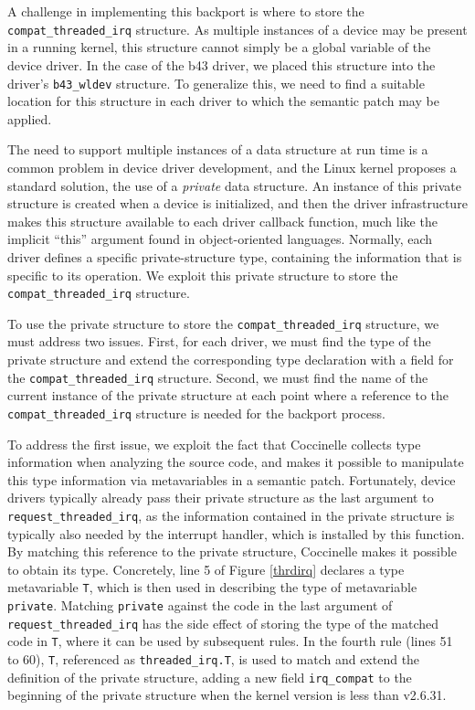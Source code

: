 A challenge in implementing this backport is where to store the {\tt
  compat\_\-threa\-ded\_\-irq} structure.  As multiple instances of a device
may be present in a running kernel, this structure cannot simply be a
global variable of the device driver.  In the case of the b43 driver, we
placed this structure into the driver's {\tt b43\_\-wldev} structure.  To
generalize this, we need to find a suitable location for this structure in
each driver to which the semantic patch may be applied.

The need to support multiple instances of a data structure at run time is a
common problem in device driver development, and the Linux kernel proposes
a standard solution, the use of a {\em private} data structure.  An
instance of this private structure is created when a device is initialized,
and then the driver infrastructure makes this structure available to each
driver callback function, much like the implicit ``this'' argument found in
object-oriented languages.  Normally, each driver defines a specific
private-structure type, containing the information that is specific to its
operation.  We exploit this private structure to store the {\tt
  compat\_\-threa\-ded\_\-irq} structure.

To use the private structure to store the {\tt compat\_\-threa\-ded\_\-irq}
structure, we must address two issues.  First, for each driver, we must
find the type of the private structure and extend the corresponding type
declaration with a field for the {\tt compat\_\-threa\-ded\_\-irq} structure.
Second, we must find the name of the current instance of the private
structure at each point where a reference to the {\tt
  compat\_\-threa\-ded\_\-irq} structure is needed for the backport process.

To address the first issue, we exploit the fact that Coccinelle collects
type information when analyzing the source code, and makes it possible to
manipulate this type information via metavariables in a semantic patch.
Fortunately, device drivers typically already pass their private structure
as the last argument to {\tt request\_\-threa\-ded\_\-irq}, as the
information contained in the private structure is typically also needed by
the interrupt handler, which is installed by this function.  By matching
this reference to the private structure, Coccinelle makes it possible to
obtain its type.  Concretely, line 5 of Figure \ref{thrdirq} declares a
type metavariable {\tt T}, which is then used in describing the type of
metavariable {\tt private}.  Matching {\tt private} against the code in the
last argument of {\tt request\_\-threa\-ded\_\-irq} has the side effect of
storing the type of the matched code in {\tt T}, where it can be used by
subsequent rules.  In the fourth rule (lines 51 to 60), {\tt T}, referenced
as {\tt threaded\_\-irq.T}, is used to match and extend the definition of
the private structure, adding a new field {\tt irq\_\-compat} to the
beginning of the private structure when the kernel version is less than
v2.6.31.

